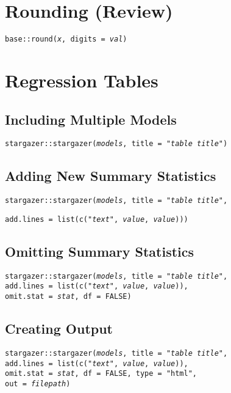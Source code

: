 \documentclass{tufte-handout}
\newenvironment{subs}
  {\adjustwidth{3em}{0pt}}
  {\endadjustwidth}
\begin{document}
\vspace{5mm}
\section{Rounding (Review)}
\noindent \texttt{base::}{\color{red}\texttt{round}}\texttt{(\textit{x}, digits = \textit{val})}

\vspace{5mm}
\section{Regression Tables}
\begin{subs}
\subsection{Including Multiple Models}
\noindent \texttt{stargazer::}{\color{red}\texttt{stargazer}}\texttt{(\textit{models}, title = "\textit{table title}")}

\vspace{3mm}
\subsection{Adding New Summary Statistics}
\noindent \texttt{stargazer::}{\color{red}\texttt{stargazer}}\texttt{(\textit{models}, title = "\textit{table title}",} 
\par \texttt{add.lines = list(c("\textit{text}", \textit{value}, \textit{value})))}

\vspace{3mm}
\subsection{Omitting Summary Statistics}
\noindent \texttt{stargazer::}{\color{red}\texttt{stargazer}}\texttt{(\textit{models}, title = "\textit{table title}", \\add.lines = list(c("\textit{text}", \textit{value}, \textit{value})), 
\\ omit.stat = \textit{stat}, df = FALSE)}

\vspace{3mm}
\subsection{Creating Output}
\noindent \texttt{stargazer::}{\color{red}\texttt{stargazer}}\texttt{(\textit{models}, title = "\textit{table title}", \\add.lines = list(c("\textit{text}", \textit{value}, \textit{value})),  
\\ omit.stat = \textit{stat}, df = FALSE, type = "html", \\out = \textit{filepath})}
\end{subs}
\end{document}

